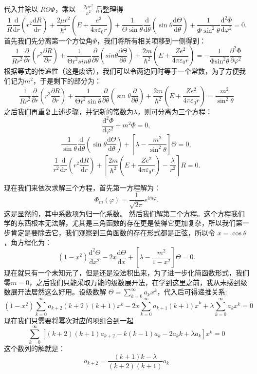 \documentclass[UTF8]{ctexbook}
\begin{document}
代入并除以 \(R\Theta\Phi\)，乘以 \(-\frac{2\mu r^2}{\hbar^2}\) 后整理得
\[
\frac{1}{R}\frac{\mathrm d}{\mathrm dr}\!\left(r^2\frac{\mathrm dR}{\mathrm dr}\right)
+\frac{2\mu r^2}{\hbar^2}\left(E+\frac{e^2}{4\pi\varepsilon_0 r}\right)
+\frac{1}{\Theta\sin\theta}\frac{\mathrm d}{\mathrm d\theta}\!\left(\sin\theta\frac{\mathrm d\Theta}{\mathrm d\theta}\right)
+\frac{1}{\Phi\sin^2\theta}\frac{\mathrm d^2\Phi}{\mathrm d\varphi^2}=0.
\]
首先我们先分离第一个方位角\(\Phi\)，我们将所有相关项移到一侧得到：
\[
\frac{1}{{Rr}^2}\frac{\partial}{\partial r}\left(r^2\frac{\partial R}{\partial r}\right)+\frac{1}{{\mathrm{\Theta r}}^2sin{\theta}}\frac{\partial}{\partial\theta}\left(sin{\theta}\frac{\partial\Theta}{\partial\theta}\right)+\frac{2m}{\hbar^2}\left(E+\frac{Ze^2}{4\pi\varepsilon_0r}\right)=-\frac{1}{{\mathrm{\Phi sin}}^2{\theta}}\frac{\partial^2\mathrm{\Phi}}{\partial\varphi^2}    
\]
根据等式的传递性（这是废话），我们可以令两边同时等于一个常数，为了方便我们记为$m^2$，于是剩下的部分为：
\[
\frac{1}{{Rr}^2}\frac{\partial}{\partial r}\left(r^2\frac{\partial R}{\partial r}\right)+\frac{1}{{\mathrm{\Theta r}}^2\sin{\theta}}\frac{\partial}{\partial\theta}\left(\sin{\theta}\frac{\partial}{\partial\theta}\right)+\frac{2m}{\hbar^2}\left(E+\frac{Ze^2}{4\pi\varepsilon_0r}\right)=\frac{m^2}{\sin^2{\theta}}
\]
之后我们再重复上述步骤，并记新的常数为$\lambda$，则可分离为三个方程：
\[
\frac{\mathrm d^2\Phi}{\mathrm d\varphi^2}+m^2\Phi=0,
\]
\[
\frac{1}{\sin\theta}\frac{\mathrm d}{\mathrm d\theta}\left(\sin\theta\frac{\mathrm d\Theta}{\mathrm d\theta}\right)
+\left[\lambda-\frac{m^2}{\sin^2\theta}\right]\Theta=0,
\]
\[
\frac{1}{r^2}\frac{\mathrm d}{\mathrm dr}\left(r^2\frac{\mathrm dR}{\mathrm dr}\right)
+\left[\frac{2m}{\hbar^2}\left(E+\frac{Ze^2}{4\pi\varepsilon_0 r}\right)-\frac{\lambda}{r^2}\right]R=0.
\]

现在我们来依次求解三个方程，首先第一方程解为：
\[
\Phi_m(\varphi)=\frac{1}{\sqrt{2\pi}}e^{im\varphi}.
\]
这是显然的，其中系数项为归一化系数。
然后我们解第二个方程。这个方程我们学的东西根本无法解，尤其是三角函数的存在更是使得它更加复杂，所以我们第一步肯定是要除去它，我们观察到三角函数的存在形式都是正弦，所以令 \(x=\cos\theta\)，角方程化为：
\[
(1-x^2)\frac{\mathrm d^2\Theta}{\mathrm dx^2}-2x\frac{\mathrm d\Theta}{\mathrm dx}
+\left[\lambda-\frac{m^2}{1-x^2}\right]\Theta=0.
\]
现在就只有一个未知元了，但是还是没法积出来，为了进一步化简函数形式，我们零$m=0$，之后我们只能采取万能的级数展开法，在学到这里之前，我从未感到级数展开法居然这么好用。设级数解 \(\Theta=\sum_{k=0}^{\infty}a_kx^k\)，代入后可得递推关系:
\[
\left(1-x^2\right)\sum_{k=0}^{\infty}{a_{k+2}\left(k+2\right)\left(k+1\right)x^k}-2x\sum_{k=0}^{\infty}{a_{k+1}{\left(k+1\right)x}^k}+\lambda\sum_{k=0}^{\infty}{a_kx^k}=0
\]
现在我们只需要将幂次对应的项组合到一起
\[
\sum_{k=0}^{\infty}{\left[\left(k+2\right)\left(k+1\right)a_{k+2}-k\left(k-1\right)a_k-2a_kk+\lambda a_k\right]x^k}=0 
\]
这个数列的解就是：
\[
a_{k+2}=\frac{\left(k+1\right)k-\lambda}{\left(k+2\right)\left(k+1\right)}a_k
\]
\end{document}

